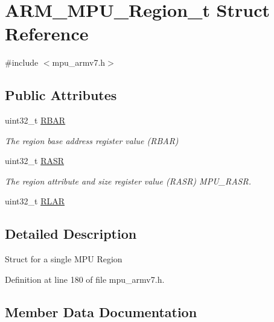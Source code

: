 \hypertarget{struct_a_r_m___m_p_u___region__t}{}\section{A\+R\+M\+\_\+\+M\+P\+U\+\_\+\+Region\+\_\+t Struct Reference}
\label{struct_a_r_m___m_p_u___region__t}


{\ttfamily \#include $<$mpu\+\_\+armv7.\+h$>$}

\subsection*{Public Attributes}
\begin{DoxyCompactItemize}
\item 
uint32\+\_\+t \hyperlink{struct_a_r_m___m_p_u___region__t_afe7a7721aa08988d915670efa432cdd2}{R\+B\+AR}
\begin{DoxyCompactList}\small\item\em The region base address register value (R\+B\+AR) \end{DoxyCompactList}\item 
uint32\+\_\+t \hyperlink{struct_a_r_m___m_p_u___region__t_a38c1d3bc6a9ffc9423d633add01928f1}{R\+A\+SR}
\begin{DoxyCompactList}\small\item\em The region attribute and size register value (R\+A\+SR) M\+P\+U\+\_\+\+R\+A\+SR. \end{DoxyCompactList}\item 
uint32\+\_\+t \hyperlink{struct_a_r_m___m_p_u___region__t_ab5d3a650dbffd0b272bf7df5b140e8a8}{R\+L\+AR}
\end{DoxyCompactItemize}


\subsection{Detailed Description}
Struct for a single M\+PU Region 

Definition at line 180 of file mpu\+\_\+armv7.\+h.



\subsection{Member Data Documentation}
\mbox{\label{struct_a_r_m___m_p_u___region__t_a38c1d3bc6a9ffc9423d633add01928f1}} 
